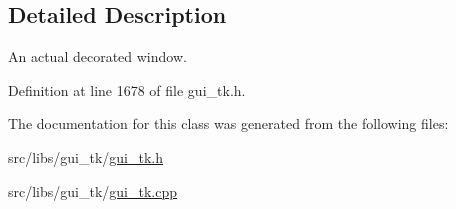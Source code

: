 \subsection{Detailed Description}
An actual decorated window. 

Definition at line 1678 of file gui\-\_\-tk.\-h.



The documentation for this class was generated from the following files\-:\begin{DoxyCompactItemize}
\item 
src/libs/gui\-\_\-tk/\hyperlink{gui__tk_8h}{gui\-\_\-tk.\-h}\item 
src/libs/gui\-\_\-tk/\hyperlink{gui__tk_8cpp}{gui\-\_\-tk.\-cpp}\end{DoxyCompactItemize}
